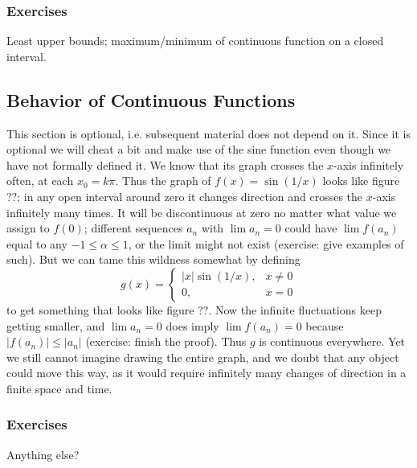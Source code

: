 {\color{red}
\subsubsection{Exercises}
Least upper bounds; maximum/minimum  of continuous function on a closed interval.
}

\subsection{Behavior of Continuous Functions}\label{sec:behaviorOfContFuncs}
This section is optional, i.e. subsequent material does not depend on it. Since it is optional we will cheat a bit and make use of the sine function even though we have not formally defined it. We know that its graph crosses the $x$-axis infinitely often, at each $x_0=k\pi$. Thus the graph of $f(x) = \sin(1/x)$ looks like figure ??; in any open interval around zero it changes direction and crosses the $x$-axis infinitely many times. It will be discontinuous at zero no matter what value we assign to $f(0)$; different sequences $a_n$ with $\lim a_n = 0$ could have $\lim f(a_n)$ equal to any $-1 \leq \alpha \leq 1$, or the limit might not exist (exercise: give examples of such). But we can tame this wildness somewhat by defining
\[
g(x) = \begin{cases}
|x|\sin(1/x), &x \neq 0\\
0, &x = 0
\end{cases}
\]
to get something that looks like figure ??. Now the infinite fluctuations keep getting smaller, and $\lim a_n = 0$ does imply $\lim f(a_n) = 0$ because $|f(a_n)| \leq |a_n|$ (exercise: finish the proof). Thus $g$ is continuous everywhere. Yet we still cannot imagine drawing the entire graph, and we doubt that any object could move this way, as it would require infinitely many changes of direction in a finite space and time.

\subsubsection{Exercises}
Anything else?

